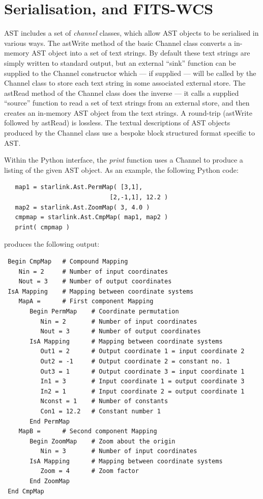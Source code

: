 \documentclass[final,authoryear,5p,times,twocolumn]{elsarticle}
\begin{document}
\section{Serialisation, and FITS-WCS}
AST includes a set of \emph{channel} classes, which allow AST objects to
be serialised in various ways. The astWrite method of the basic Channel
class converts a in-memory AST object into a set of text strings. By default
these text strings are simply written to standard output, but an external
``sink'' function can be supplied to the Channel constructor which --- if
supplied --- will be called by the Channel class to store each text
string in some associated external store. The astRead method of the
Channel class does the inverse --- it calls a supplied ``source''
function to read a set of text strings from an external store, and then
creates an in-memory AST object from the text strings. A round-trip
(astWrite followed by astRead) is lossless. The textual descriptions of
AST objects produced by the Channel class use a bespoke block structured
format specific to AST.

Within the Python interface, the \emph{print} function uses a Channel
to produce a listing of the given AST object. As an example, the
following Python code:

\begin{lstlisting}
   map1 = starlink.Ast.PermMap( [3,1],
                             [2,-1,1], 12.2 )
   map2 = starlink.Ast.ZoomMap( 3, 4.0 )
   cmpmap = starlink.Ast.CmpMap( map1, map2 )
   print( cmpmap )
\end{lstlisting}

produces the following output:

\footnotesize
\begin{verbatim}
 Begin CmpMap   # Compound Mapping
    Nin = 2     # Number of input coordinates
    Nout = 3    # Number of output coordinates
 IsA Mapping    # Mapping between coordinate systems
    MapA =      # First component Mapping
       Begin PermMap    # Coordinate permutation
          Nin = 2       # Number of input coordinates
          Nout = 3      # Number of output coordinates
       IsA Mapping      # Mapping between coordinate systems
          Out1 = 2      # Output coordinate 1 = input coordinate 2
          Out2 = -1     # Output coordinate 2 = constant no. 1
          Out3 = 1      # Output coordinate 3 = input coordinate 1
          In1 = 3       # Input coordinate 1 = output coordinate 3
          In2 = 1       # Input coordinate 2 = output coordinate 1
          Nconst = 1    # Number of constants
          Con1 = 12.2   # Constant number 1
       End PermMap
    MapB =      # Second component Mapping
       Begin ZoomMap    # Zoom about the origin
          Nin = 3       # Number of input coordinates
       IsA Mapping      # Mapping between coordinate systems
          Zoom = 4      # Zoom factor
       End ZoomMap
 End CmpMap
\end{verbatim}
\normalsize
\end{document}
